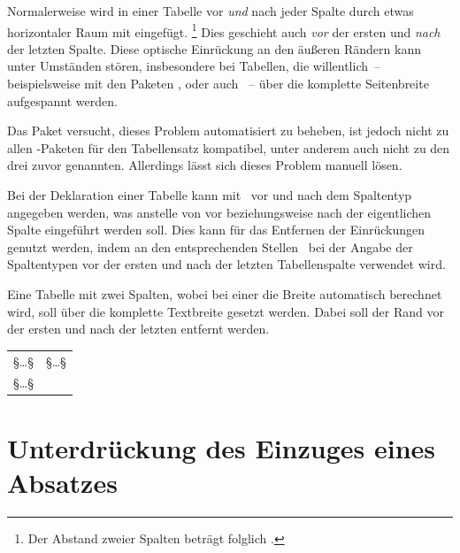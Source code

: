 Normalerweise wird in einer Tabelle vor \emph{und} nach jeder Spalte durch 
 etwas horizontaler Raum mit  
eingefügt.%
\footnote{%
  Der Abstand zweier Spalten beträgt folglich .%
}
Dies geschieht auch \emph{vor} der ersten und \emph{nach} der letzten Spalte. 
Diese optische Einrückung an den äußeren Rändern kann unter Umständen stören, 
insbesondere bei Tabellen, die willentlich~-- beispielsweise mit den Paketen 
,  oder auch ~-- über die 
komplette Seitenbreite aufgespannt werden.

Das Paket  versucht, dieses Problem automatisiert zu 
beheben, ist jedoch nicht zu allen -Paketen für den 
Tabellensatz kompatibel, unter anderem auch nicht zu den drei zuvor genannten. 
Allerdings lässt sich dieses Problem manuell lösen. 

Bei der Deklaration einer Tabelle kann mit~\MPValue{\dots} vor und 
nach dem Spaltentyp angegeben werden, was anstelle von  vor 
beziehungsweise nach der eigentlichen Spalte eingeführt werden soll. Dies kann 
für das Entfernen der Einrückungen genutzt werden, indem an den entsprechenden 
Stellen~ bei der Angabe der Spaltentypen vor der ersten und 
nach der letzten Tabellenspalte verwendet wird.
%
\begin{Example}
Eine Tabelle mit zwei Spalten, wobei bei einer die Breite automatisch berechnet 
wird, soll über die komplette Textbreite gesetzt werden. Dabei soll der Rand 
vor der ersten und nach der letzten entfernt werden.
\begin{Code}
\begin{tabularx}{\textwidth}{@{}lX@{}}
§\dots§ & §\dots§ \tabularnewline
§\dots§
\end{tabularx}
\end{Code}
\end{Example}



\section{%
  Unterdrückung des Einzuges eines Absatzes%
}

